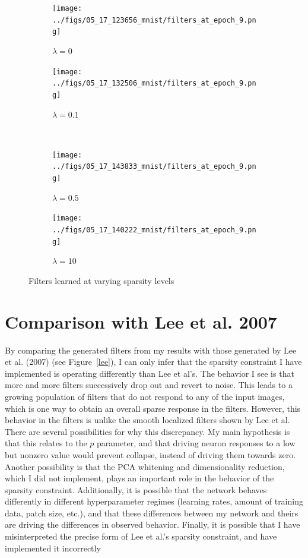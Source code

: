 \documentclass[12pt]{article}
\begin{document}
\begin{figure}[h!]
    \begin{subfigure}[b]{0.45\textwidth}
\texttt{[image: ../figs/05\_17\_123656\_mnist/filters\_at\_epoch\_9.png]}
        \caption{$\lambda=0$}
    \end{subfigure}  
    \begin{subfigure}[b]{0.45\textwidth}
\texttt{[image: ../figs/05\_17\_132506\_mnist/filters\_at\_epoch\_9.png]}
        \caption{$\lambda=0.1$}
    \end{subfigure} 
\\
    \begin{subfigure}[b]{0.45\textwidth}
\texttt{[image: ../figs/05\_17\_143833\_mnist/filters\_at\_epoch\_9.png]}
        \caption{$\lambda=0.5$}
    \end{subfigure}  
    \begin{subfigure}[b]{0.45\textwidth}
\texttt{[image: ../figs/05\_17\_140222\_mnist/filters\_at\_epoch\_9.png]}
        \caption{$\lambda=10$}
    \end{subfigure} 
    \caption{Filters learned at varying sparsity levels}
    \label{sparse}
\end{figure}

\section*{Comparison with Lee et al. 2007}

By comparing the generated filters from my results with those generated by Lee et al. (2007) (see Figure~\ref{lee}), I can only infer that the sparsity constraint I have implemented is operating differently than Lee et al's. The behavior I see is that more and more filters successively drop out and revert to noise. This leads to a growing population of filters that do not respond to any of the input images, which is one way to obtain an overall sparse response in the filters. However, this behavior in the filters is unlike the smooth localized filters shown by Lee et al. There are several possibilities for why this discrepancy. My main hypothesis is that this relates to the $p$ parameter, and that driving neuron responses to a low but nonzero value would prevent collapse, instead of driving them towards zero. Another possibility is that the PCA whitening and dimensionality reduction, which I did not implement, plays an important role in the behavior of the sparsity constraint. Additionally, it is possible that the network behaves differently in different hyperparameter regimes (learning rates, amount of training data, patch size, etc.), and that these differences between my network and theirs are driving the differences in observed behavior. Finally, it is possible that I have misinterpreted the precise form of Lee et al.'s sparsity constraint, and have implemented it incorrectly
\end{document}

